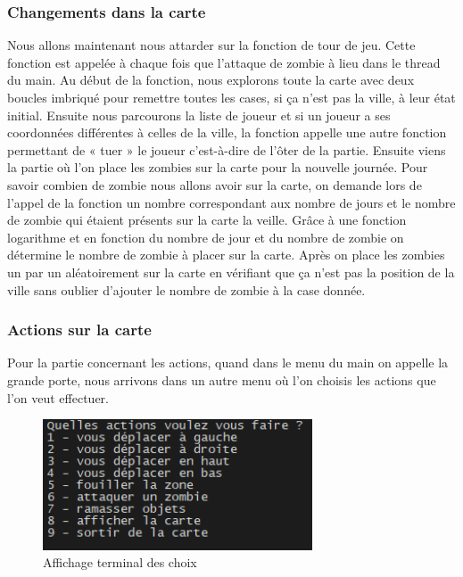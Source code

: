 \documentclass[a4paper,11pt]{article}
\begin{document}
\subsubsection{Changements dans la carte}

Nous allons maintenant nous attarder sur la fonction de tour de jeu. Cette fonction est appelée à chaque fois que l’attaque de zombie à lieu dans le thread du main. Au début de la fonction, nous explorons toute la carte avec deux boucles imbriqué pour remettre toutes les cases, si ça n’est pas la ville, à leur état initial. Ensuite nous parcourons la liste de joueur et si un joueur a ses coordonnées différentes à celles de la ville, la fonction appelle une autre fonction permettant de « tuer » le joueur c’est-à-dire de l’ôter de la partie. Ensuite viens la partie où l’on place les zombies sur la carte pour la nouvelle journée. Pour savoir combien de zombie nous allons avoir sur la carte, on demande lors de l’appel de la fonction un nombre correspondant aux nombre de jours et le nombre de zombie qui étaient présents sur la carte la veille. Grâce à une fonction logarithme et en fonction du nombre de jour et du nombre de zombie on détermine le nombre de zombie à placer sur la carte. Après on place les zombies un par un aléatoirement sur la carte en vérifiant que ça n’est pas la position de la ville sans oublier d’ajouter le nombre de zombie à la case donnée.

\subsubsection{Actions sur la carte}

Pour la partie concernant les actions, quand dans le menu du main on appelle la grande porte, nous arrivons dans un autre menu où l’on choisis les actions que l’on veut effectuer.
\\
\begin{figure}[h]
    \begin{center}
    \includegraphics[width=8cm] {choix_carte.png}
    \caption{Affichage terminal des choix}
    \label{choix}
    \end{center}
\end{figure}
\end{document}
